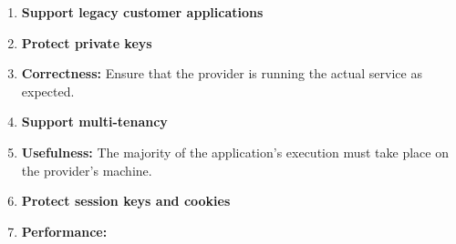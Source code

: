 \begin{enumerate}
    \item \textbf{Support legacy customer applications}
    \item \textbf{Protect private keys}
    \item \textbf{Correctness:} Ensure that the provider is running the actual
        service as expected.
    \item \textbf{Support multi-tenancy}
    \item \textbf{Usefulness:} The majority of the application's execution must
        take place on the provider's machine.

    \item \textbf{Protect session keys and cookies}

    \item \textbf{Performance:}
\end{enumerate}


%

